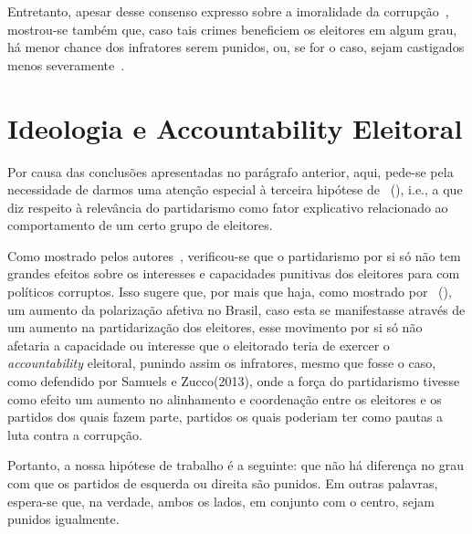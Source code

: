\documentclass[
	12pt,				%
	openright,			%
	twoside,			%
	a4paper,			%
	openany,
	english,			%
	brazil				%
	]{abntex2}
\begin{document}
Entretanto, apesar desse consenso expresso sobre a imoralidade da corrupção~\cite{Boas2019Apr}, mostrou-se também que, caso tais crimes beneficiem os eleitores em algum grau, há menor chance dos infratores serem punidos, ou, se for o caso, sejam castigados menos severamente~\cite{Botero2021Apr}. 

\section{Ideologia e Accountability Eleitoral}

Por causa das conclusões apresentadas no parágrafo anterior, aqui, pede-se pela necessidade de darmos uma atenção especial à terceira hipótese de ~(\citeyear{Botero2021Apr}), i.e., a que diz respeito à relevância do partidarismo como fator explicativo relacionado ao comportamento de um certo grupo de eleitores. 

Como mostrado pelos autores~\cite{Botero2021Apr}, verificou-se que o partidarismo por si só não tem grandes efeitos sobre os interesses e capacidades punitivas dos eleitores para com políticos corruptos. Isso sugere que, por mais que haja, como mostrado por ~(\citeyear{fuks2020afeto}), um aumento da polarização afetiva no Brasil, caso esta se manifestasse através de um aumento na partidarização dos eleitores, esse movimento por si só não afetaria a capacidade ou interesse que o eleitorado teria de exercer o \textit{accountability} eleitoral, punindo assim os infratores, mesmo que fosse o caso, como defendido por Samuels e Zucco(2013), onde a força do partidarismo tivesse como efeito um aumento no alinhamento e coordenação entre os eleitores e os partidos dos quais fazem parte, partidos os quais poderiam ter como pautas a luta contra a corrupção. 

Portanto, a nossa hipótese de trabalho é a seguinte: que não há diferença no grau com que os partidos de esquerda ou direita são punidos. Em outras palavras, espera-se que, na verdade, ambos os lados, em conjunto com o centro, sejam punidos igualmente.


\end{document}

